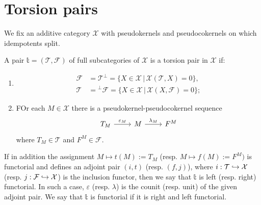 \section{Torsion pairs}

We fix an additive category $\mathcal{X}$ with pseudokernels and pseudocokernels
on which idempotents split.

\begin{definition}
  A pair $\mathbb{t}=(\mathcal{T},\mathcal{F})$ of full subcategories of $\mathcal{X}$
  is a torsion pair in $\mathcal{X}$ if:
  \begin{enumerate}
    \item
    \begin{align*}
      \mathcal{F}&=\mathcal{T}^\perp = \{X\in\mathcal{X}\,|\,\mathcal{X}(\mathcal{T},X)=0\},\\
      \mathcal{T}&={^\perp\mathcal{F}} = \{X\in\mathcal{X}\,|\,\mathcal{X}(X,\mathcal{F})=0\};
    \end{align*}
    \item FOr each $M\in\mathcal{X}$ there is a pseudokernel-pseudocokernel sequence
    \begin{equation*}
      \begin{tikzcd}
        T_M\arrow{r}{\varepsilon_M}& M\arrow{r}{\lambda_M}&F^M
      \end{tikzcd}
    \end{equation*}
    where $T_M\in\mathcal{T}$ and $F^M\in\mathcal{F}$.
  \end{enumerate}

  If in addition the assignment $M\mapsto t(M) :=T_M$ (resp. $M\mapsto f(M):=F^M)$ is
  functorial and defines an adjoint pair $(i,t)$ (resp. $(f,j)$), where $i:\mathcal{T}\hookrightarrow \mathcal{X}$
  (resp. $j:\mathcal{F}\hookrightarrow \mathcal{X}$) is the inclusion functor, then we say that
  $\mathbb{t}$ is left (resp. right) functorial. In such a case,
  $\varepsilon$ (resp. $\lambda$) is the counit (resp. unit) of the given adjoint pair. We say
  that $\mathbb{t}$ is functorial if it is right and left functorial.
\end{definition}

